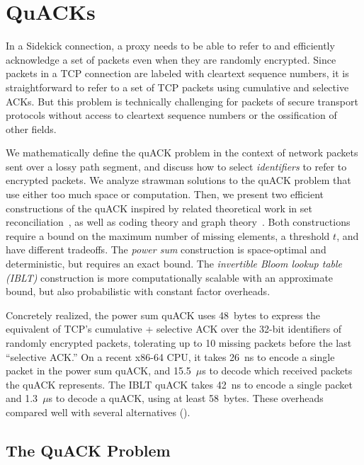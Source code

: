 \chapter{QuACKs}
\label{sec:quack}

In a Sidekick connection, a proxy needs to be able to refer to and efficiently
acknowledge a set of packets even when they are randomly encrypted. Since
packets in a TCP connection are labeled with cleartext sequence numbers, it is
straightforward to refer to a set of TCP packets using cumulative and selective
ACKs. But this problem is technically challenging for packets of secure
transport protocols without access to cleartext sequence numbers or the
ossification of other fields.

We mathematically define the quACK problem in the context of network packets
sent over a lossy path segment, and discuss how to select \emph{identifiers} to
refer to encrypted packets. We analyze strawman solutions to the quACK problem
that use either too much space or computation. Then, we present two efficient
constructions of the quACK inspired by related theoretical work in set
reconciliation~\cite{minsky2003set,eppstein2011straggler}, as well as coding
theory and graph theory~\cite{karpovsky2003data}. Both constructions require a
bound on the maximum number of missing elements, a threshold $t$, and have
different tradeoffs. The \textit{power sum} construction is space-optimal and
deterministic, but requires an exact bound. The \textit{invertible Bloom lookup
table (IBLT)} construction is more computationally scalable with an approximate
bound, but also probabilistic with constant factor overheads.

Concretely realized, the power sum quACK uses 48~bytes to express the equivalent
of TCP's cumulative + selective ACK over the 32-bit identifiers of randomly
encrypted packets, tolerating up to 10 missing packets before the last
``selective ACK.'' On a recent x86-64 CPU, it takes 26~ns to encode a single
packet in the power sum quACK, and 15.5~$\mu$s to decode which received packets
the quACK represents. The IBLT quACK takes 42~ns to encode a single packet and
1.3~$\mu$s to decode a quACK, using at least 58~bytes. These overheads compared
well with several alternatives
().



\section{The QuACK Problem}
\label{sec:quack:problem}

